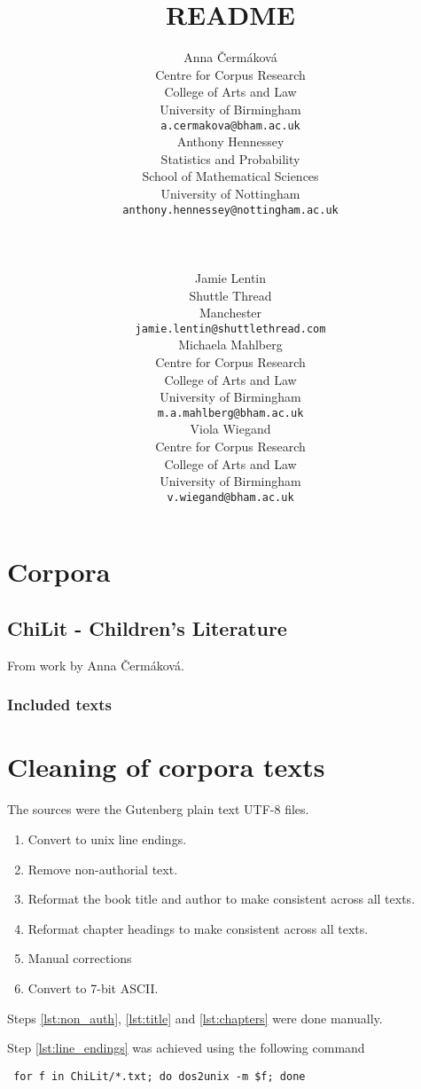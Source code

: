\documentclass[a4paper,10pt]{paper}
\date{}
\author{
    \scriptsize
    \parbox{0.25\textwidth}{
       \small
       Anna Čermáková \\
       \scriptsize
       Centre for Corpus Research\\ College of Arts and Law\\ University of Birmingham\\
       \texttt{a.cermakova@bham.ac.uk}
    }
    \parbox{0.30\textwidth}{
        \small Anthony Hennessey \\
        \scriptsize
        Statistics and Probability\\ School of Mathematical Sciences\\ University of Nottingham \\
        \texttt{anthony.hennessey@nottingham.ac.uk}
    }
    \\ \\
    \parbox{0.30\textwidth}{
       \small
       Jamie Lentin \\
       \scriptsize
       Shuttle Thread\\ Manchester \\
       \texttt{jamie.lentin@shuttlethread.com}
    }
    \parbox{0.25\textwidth}{
       \small
       Michaela Mahlberg \\
       \scriptsize
       Centre for Corpus Research\\ College of Arts and Law\\ University of Birmingham \\
       \texttt{m.a.mahlberg@bham.ac.uk}
    }
    \parbox{0.25\textwidth}{
       \small
       Viola Wiegand \\
       \scriptsize
       Centre for Corpus Research\\ College of Arts and Law\\ University of Birmingham \\
       \texttt{v.wiegand@bham.ac.uk}
    }
}
\title{README}
\begin{document}
\nocite{*}

\maketitle

\tableofcontents

\section{Corpora}

\subsection{ChiLit - Children's Literature}
From work by Anna Čermáková.

\subsubsection{Included texts}
\printbibliography[heading=none,keyword=ChiLit]

\section{Cleaning of corpora texts} \label{se:cleaning}
The sources were the Gutenberg plain text UTF-8 files.

\begin{enumerate}
    \item \label{lst:line_endings} Convert to unix line endings.
    \item \label{lst:non_auth} Remove non-authorial text.
    \item \label{lst:title} Reformat the book title and author to make consistent across all texts. 
    \item \label{lst:chapters} Reformat chapter headings to make consistent across all texts. 
    \item \label{lst:manual} Manual corrections
    \item \label{lst:ascii_7} Convert to 7-bit ASCII.
\end{enumerate}

Steps \ref{lst:non_auth}, \ref{lst:title} and \ref{lst:chapters} were done manually.

Step \ref{lst:line_endings} was achieved using the following command
\begin{verbatim} for f in ChiLit/*.txt; do dos2unix -m $f; done \end{verbatim}
\end{document}
